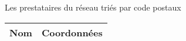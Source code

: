 \documentclass{article}
\newcommand{\nameWidth}{13cm}
\newcommand{\dataWidth}{6cm}
\begin{document}

\pagebreak

  \begin{center}


\pagebreak

    {\Large Les prestataires du réseau triés par code postaux}
    \begin{longtable}{|m{\nameWidth} | m{\dataWidth}|}
      \hline
      Nom & Coordonnées  \\ 
      \hline 
      \endhead

      
    \end{longtable}
  \end{center}
\end{document}
